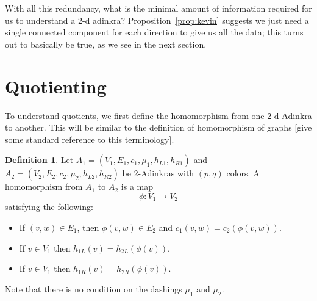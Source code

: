 \documentclass[12pt,twoside,singlespace]{article}
\numberwithin{equation}{section}
\newtheorem{lem}[equation]{Lemma}
\theoremstyle{definition}
\newtheorem{definition}[equation]{Definition}
\newcommand{\ZZ}{\mathbf{Z}}
\begin{document}
With all this redundancy, what is the minimal amount of information required for us to understand a $2$-d adinkra? Proposition~\ref{prop:kevin} suggests we just need a single connected component for each direction to give us all the data; this turns out to basically be true, as we see in the next section.

\begin{comment}
\begin{lem}
\label{lem:square}
In a $2$-d adinkra, suppose we have a path $(x, y \pm_1 1) \rightarrow (x, y) \rightarrow (x \pm_2 1, y)$, where each $\pm_i$ corresponds to a choice of sign, the first and the last vertices are connected to $(x \pm_2 1, y \pm_1 1)$ via the corresponding colors in a square.
\end{lem}
\begin{proof}
Because we have an ($1$-d) adinkra, the two edges in this path correspond to two different colors (WLOG $1$ and $2$ in order) respectively, and if we use the colors $2$ and $1$ in order we must also reach $(x \pm_2 1, y)$ from $(x, y \pm_1 1)$. Because left-moving colors only correspond to $y$-axis moves in the $\ZZ^2$ bigrading, and right-moving colors only correspond to $x$-axis moves, the first move must have displacement $(\pm_2 1, 0)$ and the second move must have displacement $(0, \pm_1)$. This is exactly equivalent to the statement.
\end{proof}
\end{comment}

\begin{comment}



We will worry less about exact rankings right now with the following construction: 

\end{comment}


\section{Quotienting}
To understand quotients, we first define the homomorphism from one $2$-d Adinkra to another.  This will be similar to the definition of homomorphism of graphs [give some standard reference to this terminology].

\begin{definition}
Let 
$A_1=(V_1,E_1,c_1,\mu_1,h_{L1},h_{R1})$
and
$A_2=(V_2,E_2,c_2,\mu_2,h_{L2},h_{R2})$
be 2-Adinkras with $(p,q)$ colors.  A homomorphism from $A_1$ to $A_2$ is a map
\[\phi:V_1\to V_2\]
satisfying the following:
\begin{itemize}
\item If $(v,w)\in E_1$, then $\phi(v,w)\in E_2$ and $c_1(v,w)=c_2(\phi(v,w))$.
\item If $v\in V_1$ then $h_{1L}(v)=h_{2L}(\phi(v))$.
\item If $v\in V_1$ then $h_{1R}(v)=h_{2R}(\phi(v))$.
\end{itemize}
Note that there is no condition on the dashings $\mu_1$ and $\mu_2$.
\end{definition}
\end{document}
